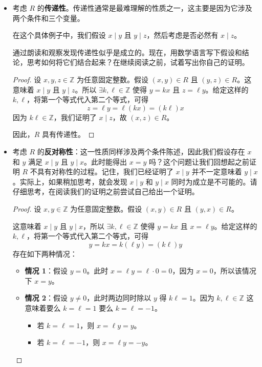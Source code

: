 \begin{example}
\begin{itemize}
\begin{proof}
            这证明了 $R$ 不具有\emph{对称性}。
        \end{proof}

        \item 考虑 $R$ 的\textbf{传递性}。传递性通常是最难理解的性质之一，这主要是因为它涉及两个条件和三个变量。

        在这个具体例子中，我们假设 $x \mid y$ 且 $y \mid z$，然后考虑是否必然有 $x \mid z$。
        
        通过朗读和观察发现传递性似乎是成立的。现在，用数学语言写下假设和结论，思考如何将它们结合起来？在继续阅读之前，试着写出你自己的证明。
        \begin{proof}
            设 $x, y, z \in \mathbb{Z}$ 为任意固定整数。假设 $(x, y) \in R$ 且 $(y, z) \in R$。这意味着 $x \mid y$ 且 $y \mid z$。所以 $\exists k, \ell \in \mathbb{Z}$ 使得 $y = kx$ 且 $z = \ell y$。给定这样的 $k, \ell$，将第一个等式代入第二个等式，可得
            \[z = \ell y = \ell (kx) = (k \ell)x\]
            因为 $k \ell \in \mathbb{Z}$，我们证明了 $x \mid z$，故 $(x, z) \in R$。

            因此，$R$ 具有传递性。
        \end{proof}

        \item 考虑 $R$ 的\textbf{反对称性}：这一性质同样涉及两个条件陈述，因此我们假设存在 $x$ 和 $y$ 满足 $x \mid y$ 且 $y \mid x$。此时能得出 $x = y$ 吗？这个问题让我们回想起之前证明 $R$ 不具有对称性的过程。记住，我们已经证明了 $x \mid y$ 并不一定意味着 $y \mid x$。实际上，如果稍加思考，就会发现 $x \mid y$ 和 $y \mid x$ 同时为成立是不可能的。请仔细思考，在阅读我们的证明之前尝试自己给出一个证明。
        \begin{proof}
            设 $x, y \in \mathbb{Z}$ 为任意固定整数。假设 $(x, y) \in R$ 且 $(y,x) \in R$。

            这意味着 $x \mid y$ 且 $y \mid x$，所以 $\exists k, \ell \in \mathbb{Z}$ 使得 $y = kx$ 且 $x = \ell y$。给定这样的 $k, \ell$，将第一个等式代入第二个等式，可得
            \[y = kx = k(\ell y) = (k \ell)y\]
            存在如下两种情况：
            \begin{itemize}
                \item \textbf{情况 1}：假设 $y=0$。此时 $x = \ell y = \ell \cdot 0 = 0$，因为 $x=0$，所以该情况下 $x=y$。
                \item \textbf{情况 2}：假设 $y \ne 0$，此时两边同时除以 $y$ 得 $k \ell = 1$。因为 $k, \ell \in \mathbb{Z}$ 这意味着要么 $k = \ell = 1$ 要么 $k = \ell = -1$。
                \begin{itemize}
                    \item 若 $k = \ell = 1$，\enspace 则 $x = \ell y = y$。
                    \item 若 $k = \ell = -1$，则 $x = \ell y = -y$。
                \end{itemize}
            \end{itemize}
            

\end{proof}
\end{itemize}
\end{example}
